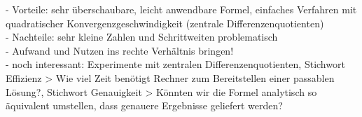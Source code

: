 \documentclass{scrartcl}
\begin{document}
- Vorteile: sehr überschaubare, leicht anwendbare Formel, einfaches Verfahren mit
quadratischer Konvergenzgeschwindigkeit (zentrale Differenzenquotienten) \\
- Nachteile: sehr kleine Zahlen und Schrittweiten problematisch \\
- Aufwand und Nutzen ins rechte Verhältnis bringen! \\
- noch interessant: Experimente mit zentralen Differenzenquotienten, Stichwort
Effizienz > Wie viel Zeit benötigt Rechner zum Bereitstellen einer passablen Lösung?,
Stichwort Genauigkeit > Könnten wir die Formel analytisch so äquivalent umstellen,
dass genauere Ergebnisse geliefert werden? \\



\end{document}
